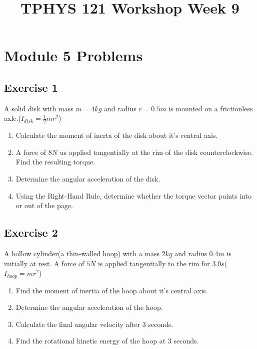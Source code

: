 \documentclass[11pt]{article}
\title{TPHYS 121 Workshop Week 9}
\author{}
\date{\vspace{-15ex}}
\newenvironment{exercise}{
    \begin{mdframed}[style=problemstyle]\textcolor{black}{}
}{
    \end{mdframed}
}
\begin{document}
\maketitle

\section*{Module 5 Problems}
\subsection*{Exercise 1}
\begin{exercise}
    A solid disk with mass $m=4kg$ and radius $r=0.5m$ is mounted on
    a frictionless axle.($I_{disk} = \frac{1}{2}mr^2$)
    \begin{enumerate}[label=(\alph*)]
        \item Calculate the moment of inerta of the disk about it's central
            axis.
        \item A force of $8N$ us applied tangentially at the rim of the disk
            counterclockwise. Find the resulting torque.
        \item Determine the angular acceleration of the disk.
        \item Using the Right-Hand Rule, determine whether the torque 
            vector points into or out of the page.
    \end{enumerate}
\end{exercise}

\subsection*{Exercise 2}
\begin{exercise}
    A hollow cylinder(a thin-walled hoop) with a mass $2kg$ and radius
    $0.4m$ is initially at rest. A force of $5N$ is applied tangentially 
    to the rim for $3.0s$($I_{hoop} = mr^2$)
    \begin{enumerate}[label=(\alph*)]
        \item Find the moment of inertia of the hoop about it's central axis. 
        \item Determine the angular acceleration of the hoop. 
        \item Calculate the final angular velocity after $3$ seconds.
        \item Find the rotational kinetic energy of the hoop at $3$ seconds.
    \end{enumerate}
\end{exercise}
\end{document}
